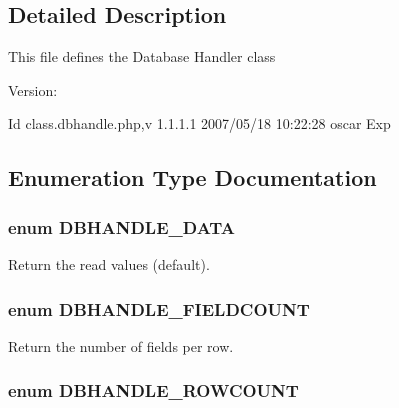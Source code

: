 \subsection{Detailed Description}
This file defines the Database Handler class \begin{Desc}
\item[Version:]\end{Desc}
\begin{Desc}
\item[Id]class.dbhandle.php,v 1.1.1.1 2007/05/18 10:22:28 oscar Exp \end{Desc}


\subsection{Enumeration Type Documentation}
\hypertarget{class_8dbhandler_8php_cc5178c2a582eafa4ef488ed3394b725}{
\subsubsection{\setlength{\rightskip}{0pt plus 5cm}enum {\bf DBHANDLE\_\-DATA}}}
\label{class_8dbhandler_8php_cc5178c2a582eafa4ef488ed3394b725}


Return the read values (default). 

\hypertarget{class_8dbhandler_8php_fda554c4527b03446f287291626c12ad}{
\subsubsection{\setlength{\rightskip}{0pt plus 5cm}enum {\bf DBHANDLE\_\-FIELDCOUNT}}}
\label{class_8dbhandler_8php_fda554c4527b03446f287291626c12ad}


Return the number of fields per row. 

\hypertarget{class_8dbhandler_8php_c904f05455a162c07c216c330ad7c5c6}{
\subsubsection{\setlength{\rightskip}{0pt plus 5cm}enum {\bf DBHANDLE\_\-ROWCOUNT}}}
\label{class_8dbhandler_8php_c904f05455a162c07c216c330ad7c5c6}


